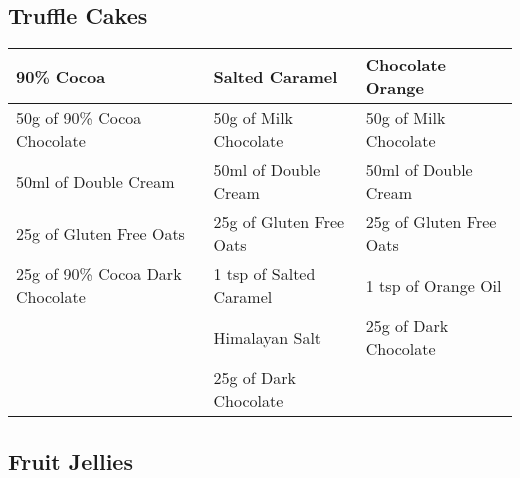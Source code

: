 \documentclass[11pt, english]{article}
\begin{document}

\newpage

	\subsection{Truffle Cakes}

	\begin{table}[h]
        	\scriptsize
	\begin{center}
	\begin{tabular}{p{4.5cm}p{4.5cm}p{4.5cm}}
	        \hline
	        \textbf{90\% Cocoa} & \textbf{Salted Caramel} & \textbf{Chocolate Orange}\\
	        \hline
	        50g of 90\% Cocoa Chocolate & 50g of Milk Chocolate & 50g of Milk Chocolate\\
	        50ml of Double Cream & 50ml of Double Cream & 50ml of Double Cream\\
	        25g of Gluten Free Oats & 25g of Gluten Free Oats & 25g of Gluten Free Oats\\
	        25g of 90\% Cocoa Dark Chocolate & 1 tsp of Salted Caramel & 1 tsp of Orange Oil\\
	        & Himalayan Salt & 25g of Dark Chocolate\\
	        & 25g of Dark Chocolate & \\
	        \hline
	\end{tabular}
	\end{center}
	\end{table}

\newpage

	\subsection{Fruit Jellies}
\end{document}
